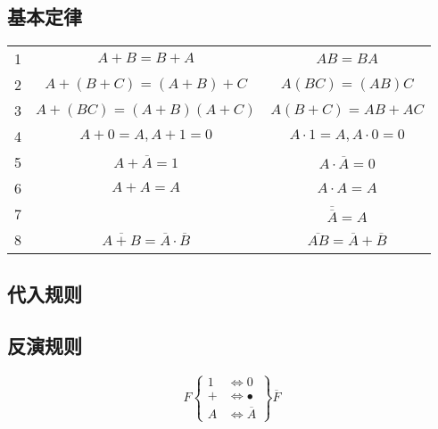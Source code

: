 \newpage

\subsection{基本定律}

\begin{table}[!htbp]
    \centering
    \begin{tabular}{c|c|c}
        \toprule
        1 & $A+B=B+A$                                      & $AB=BA$                                 \\
        2 & $A+(B+C)=(A+B)+C$                              & $A(BC)=(AB)C$                           \\
        3 & $A+(BC)=(A+B)(A+C)$                            & $A(B+C)=AB+AC$                          \\
        4 & $A+0=A , A+1=0$                                & $A \cdot 1=A , A \cdot 0=0$             \\
        5 & $A+\overline A =1$                             & $A \cdot \overline A  =0$               \\
        6 & $A+A=A$                                        & $A \cdot A=A$                           \\
        7 &                                                & $\overline{\overline A}=A$              \\
        8 & $\overline{A+B}=\overline A \cdot \overline B$ & $\overline{AB}=\overline A+\overline B$ \\
        \bottomrule
    \end{tabular}
\end{table}

\subsection{代入规则}

\subsection{反演规则}

\begin{equation}
    F\left\{
    \begin{aligned}
        1 & \Longleftrightarrow 0           \\
        + & \Longleftrightarrow \bullet     \\
        A & \Longleftrightarrow \overline A
    \end{aligned}
    \right\}\overline F
\end{equation}

